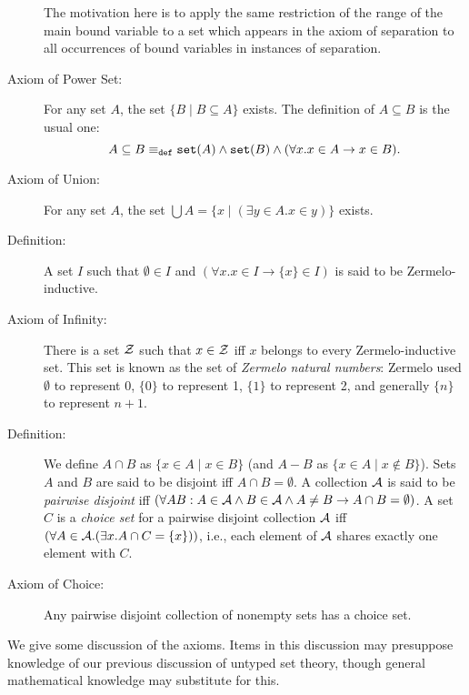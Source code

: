 \documentclass[12pt]{book}
\begin{document}
\begin{description}
The motivation here is to apply the same restriction of the range of the main bound variable to a set which appears in the axiom of separation to all occurrences of bound variables in instances of separation. 

\item[Axiom of Power Set:] For any set $A$, the set $\{B \mid B \subseteq A\}$
exists.  The definition of $A \subseteq B$ is the usual one:  $$A \subseteq B \equiv_{\tt def} {\tt set}(A) \wedge {\tt set}(B) \wedge (\forall x.x \in A \rightarrow x \in B).$$ 

\item[Axiom of Union:] For any set $A$, the set $\bigcup A = \{x \mid (\exists
y \in A.x \in y)\}$ exists.

\item[Definition:]  A set $I$ such that $\emptyset \in I$
and $(\forall x.x \in I \rightarrow \{x\} \in I)$ is said to be Zermelo-inductive.

\item[Axiom of Infinity:]  There is a set $\cal Z$ such that $x \in \cal Z$ iff $x$ belongs to every Zermelo-inductive set.   This set is known as the set of {\em Zermelo natural numbers\/}:  Zermelo used $\emptyset$ to represent 0, $\{0\}$ to represent 1, $\{1\}$ to represent 2, and generally $\{n\}$ to represent $n+1$.

\item[Definition:]  We define $A \cap B$ as $\{x \in A \mid x \in B\}$ (and $A-B$ as \newline $\{x \in A\mid x \not\in B\}$).  Sets $A$ and $B$ are said to be disjoint iff  $A \cap B = \emptyset$.  A collection ${\cal A}$ is said to be {\em pairwise disjoint\/} iff $(\forall AB:  A \in {\cal A} \wedge B \in {\cal A} \wedge A \neq B \rightarrow A \cap B = \emptyset)$.  A set $C$ is a {\em choice set\/} for a pairwise disjoint collection $\cal A$ iff $(\forall A \in {\cal A}.(\exists x.A \cap C = \{x\}))$, i.e., each element of $\cal A$ shares exactly one element with $C$.

\item[Axiom of Choice:] Any pairwise disjoint collection of nonempty sets has a
choice set.

\end{description}

We give some discussion of the axioms.  Items in this discussion may presuppose knowledge of our previous discussion of untyped set theory, though general mathematical knowledge may substitute for this.
\end{document}

